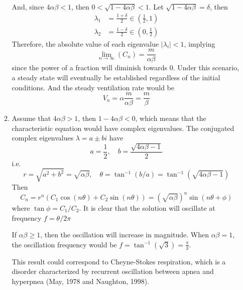 \begin{homeworkProblem}
\begin{enumerate}
\begin{enumerate}[label=(\arabic*)]
    And, since $4 \alpha\beta < 1$, then $ 0 < \sqrt{1 - 4\alpha\beta} < 1$. Let
    $\sqrt{1 - 4\alpha\beta} = \delta$, then \[
    \begin{aligned}
        \lambda_1 &= \frac{1+\delta}{2} \in (\frac{1}{2}, 1)\\
        \lambda_2 &= \frac{1-\delta}{2} \in (0, \frac{1}{2})
    \end{aligned}
    \]
    Therefore, the absolute value of each eigenvalue $|\lambda_i| < 1$, implying \[
        \lim_{n \to \infty} (C_{n}) = \frac{m}{\alpha\beta}
    \] since the power of a fraction will diminish towards $0$.
    Under this scenario, a steady state will eventually be established regardless of
     the initial conditions. And the steady ventilation rate would be \[
        V_{n} = \alpha \frac{m}{\alpha\beta} = \frac{m}{\beta}
    \]

    \item Assume that $4\alpha\beta > 1$, then $1 - 4\alpha\beta < 0$, which means
    that the characteristic equation would have complex eigenvalues. The conjugated
    complex eigenvalues $\lambda = a \pm bi$ have \[
        a = \frac{1}{2}, \quad b = \frac{\sqrt{4\alpha\beta - 1}}{2}
    \]
    i.e. \[
        r = \sqrt{a^2 + b^2} = \sqrt{\alpha\beta}, \quad \theta = \tan^{-1}(b/a)
        = \tan^{-1}(\sqrt{4\alpha\beta - 1})
    \]
    Then \[
        C_n = r^n (C_1 \cos(n\theta) + C_2 \sin(n\theta))
        = (\sqrt{\alpha\beta})^n \sin(n\theta + \phi)
    \]
    where $\tan \phi = C_1/C_2$. It is clear that the solution will oscillate at
    frequency $f = \theta/2\pi$

    If $\alpha\beta \geq 1$, then the oscillation will increase in magnitude. When
    $\alpha\beta = 1$, the oscillation frequency would be $f = \tan^{-1}(\sqrt{3}) =
    \frac{\pi}{3}$.

    This result could correspond to Cheyne-Stokes respiration, which is a disorder
    characterized by recurrent oscillation between apnea and hyperpnea (May, 1978
    and Naughton, 1998).
    \end{enumerate}%


\end{enumerate}
\end{homeworkProblem}
